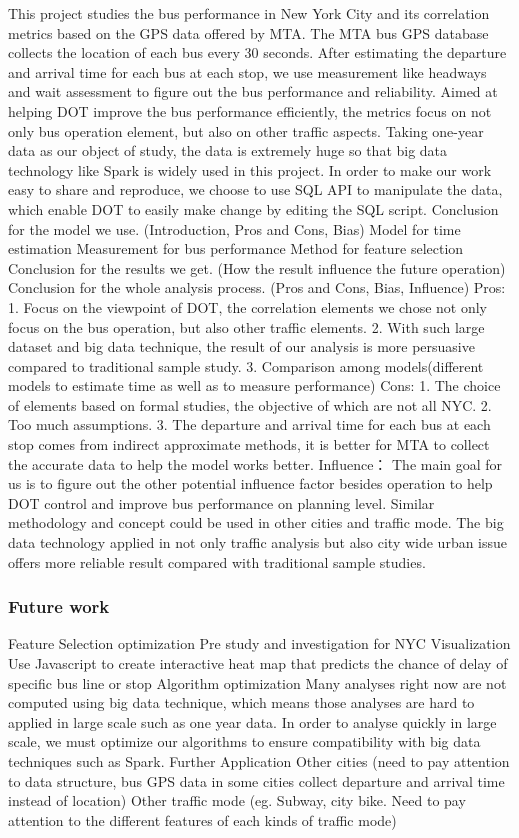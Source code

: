\documentclass[12pt]{report}
\begin{document}
This project studies the bus performance in New York City and its correlation metrics based on the GPS data offered by MTA. The MTA bus GPS database collects the location of each bus every 30 seconds. After estimating the departure and arrival time for each bus at each stop, we use measurement like headways and wait assessment to figure out the bus performance and reliability. Aimed at helping DOT improve the bus performance efficiently, the metrics focus on not only bus operation element, but also on other traffic aspects. Taking one-year data as our object of study, the data is extremely huge so that big data technology like Spark is widely used in this project. In order to make our work easy to share and reproduce, we choose to use SQL API to manipulate the data, which enable DOT to easily make change by editing the SQL script. 
Conclusion for the model we use. (Introduction, Pros and Cons, Bias)
Model for time estimation
Measurement for bus performance
Method for feature selection
Conclusion for the results we get. (How the result influence the future operation)
Conclusion for the whole analysis process. (Pros and Cons, Bias, Influence)
Pros:
1. Focus on the viewpoint of DOT, the correlation elements we chose not only focus on the bus operation, but also other traffic elements.
2. With such large dataset and big data technique, the result of our analysis is more persuasive compared to traditional sample study.
3. Comparison among models(different models to estimate time as well as to measure performance)
Cons:
1. The choice of elements based on formal studies, the objective of which are not all NYC.
2. Too much assumptions.
3. The departure and arrival time for each bus at each stop comes from indirect approximate methods, it is better for MTA to collect the accurate data to help the model works better.
Influence：
The main goal for us is to figure out the other potential influence factor besides operation to help DOT control and improve bus performance on planning level. Similar methodology and concept could be used in other cities and traffic mode. The big data technology applied in not only traffic analysis but also city wide urban issue offers more reliable result compared with traditional sample studies. 


\subsubsection{Future work}

Feature Selection optimization
Pre study and investigation for NYC
Visualization
Use Javascript to create interactive heat map that predicts the chance of delay of specific bus line or stop
Algorithm optimization
Many analyses right now are not computed using big data technique, which means those analyses are hard to applied in large scale such as one year data. In order to analyse quickly in large scale, we must optimize our algorithms to ensure compatibility with big data techniques such as Spark.
Further Application
Other cities (need to pay attention to data structure, bus GPS data in some cities collect departure and arrival time instead of location)
Other traffic mode (eg. Subway, city bike. Need to pay attention to the different features of each kinds of traffic mode)
\end{document}

